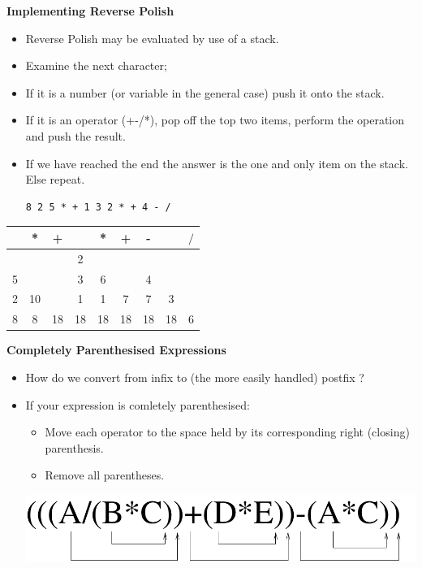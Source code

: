 \documentclass[a4,portraitt]{slides}
\begin{document}
\newpage
{\samepage
\begin{center}
{\Large{\bf Implementing Reverse Polish}}
\end{center}
\begin{itemize}
\item Reverse Polish may be evaluated by use of a stack.
\item Examine the next character;
\item If it is a number (or variable in the general case)
push it onto the stack.
\item If it is an operator (+-/*), pop off the top two
items, perform the operation and push the result.
\item If we have reached the end the answer is the one and only
item on the stack. Else repeat.
\begin{verbatim}
8 2 5 * + 1 3 2 * + 4 - /
\end{verbatim}
\end{itemize}

\begin{center}
\begin{tabular}{|c|c|c|c|c|c|c|c|c|}\hline
   & * & + &   & * & + & - &   & $/$ \\ \hline
   &   &   & 2 &   &   &   &   &     \\
 5 &   &   & 3 & 6 &   & 4 &   &     \\
 2 & 10&   & 1 & 1 & 7 & 7 & 3 &     \\
 8 & 8 & 18& 18& 18& 18& 18& 18& 6   \\ \hline
\end{tabular}
\end{center}
}

\newpage
{\samepage
\begin{center}
{\Large{\bf Completely Parenthesised Expressions}}
\end{center}
\begin{itemize}
\item How do we convert from infix to (the more
easily handled) postfix ?
\item If your expression is comletely parenthesised:
\begin{itemize}
\item Move each operator to the space held by its
corresponding right (closing) parenthesis.
\item Remove all parentheses.
\end{itemize}
\begin{center}
\includegraphics{../Images/cmplte.pdf}
\end{center}
\end{itemize}
}
\end{document}
